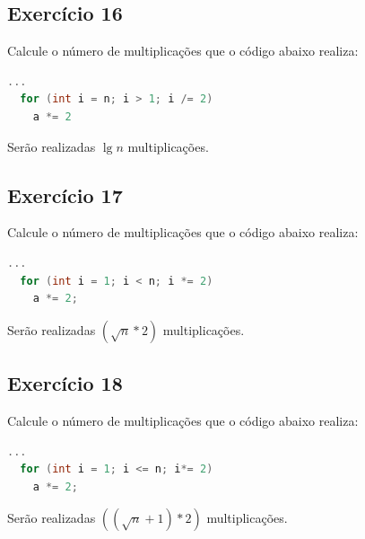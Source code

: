 \documentclass[12pt]{article}
\begin{document}



\subsection{Exercício 16}
Calcule o número de multiplicações que o código abaixo realiza:
\begin{lstlisting}[language=C]
  ...
  for (int i = n; i > 1; i /= 2)
    a *= 2
\end{lstlisting}
Serão realizadas $\lg{n}$ multiplicações.




\subsection{Exercício 17}
Calcule o número de multiplicações que o código abaixo realiza:
\begin{lstlisting}[language=C]
  ...
  for (int i = 1; i < n; i *= 2)
    a *= 2;
\end{lstlisting}
Serão realizadas $(\sqrt{n}*2)$ multiplicações.

\subsection{Exercício 18}
Calcule o número de multiplicações que o código abaixo realiza:
\begin{lstlisting}[language=C]
  ...
  for (int i = 1; i <= n; i*= 2)
    a *= 2;
\end{lstlisting}
Serão realizadas $((\sqrt{n}+1)*2)$ multiplicações.



\end{document}
